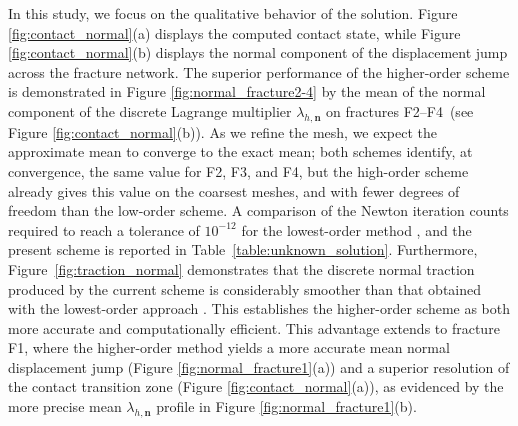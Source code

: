 \documentclass[a4paper,11pt]{article}
\theoremstyle{definition}
\theoremstyle{remark}
\newcommand{\bo}[1]{\mathbf{#1}}
\begin{document}
In this study, we focus on the qualitative behavior of the solution. Figure \ref{fig:contact_normal}(a) displays the computed contact state, while Figure \ref{fig:contact_normal}(b) displays the normal component of the displacement jump across the fracture network. The superior performance of the higher-order scheme is demonstrated in Figure \ref{fig:normal_fracture2-4} by the mean of the normal component of the discrete Lagrange multiplier $\lambda_{h, \bo{n}}$ on fractures F2--F4~(see Figure \ref{fig:contact_normal}(b)). As we refine the mesh, we expect the approximate mean to converge to the exact mean; both schemes identify, at convergence, the same value for F2, F3, and F4, but the high-order scheme already gives this value on the coarsest meshes, and with fewer degrees of freedom than the low-order scheme. A comparison of the Newton iteration counts required to reach a tolerance of $10^{-12}$
 for the lowest-order method \cite{jhr}, and the present scheme is reported in Table~\ref{table:unknown_solution}. Furthermore, Figure~\ref{fig:traction_normal} demonstrates that the discrete normal traction produced by the current scheme is considerably smoother than that obtained with the lowest-order approach \cite{jhr}.
This establishes the higher-order scheme as both more accurate and computationally efficient. This advantage extends to fracture F1, where the higher-order method yields a more accurate mean normal displacement jump (Figure \ref{fig:normal_fracture1}(a)) and a superior resolution of the contact transition zone (Figure \ref{fig:contact_normal}(a)), as evidenced by the more precise mean $\lambda_{h,\bo{n}}$ profile in Figure \ref{fig:normal_fracture1}(b).
\end{document}

